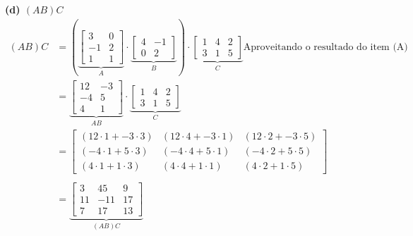 \documentclass[a4paper,12pt]{article}
\begin{document}
\textbf{(d) $(AB)C$}
\begin{align*}
    (AB)C &=( 
    \underbrace{
    \begin{bmatrix}
        3 & 0\\
        -1 & 2\\
        1 & 1
    \end{bmatrix}}_{A} 
    \cdot
    \underbrace{
    \begin{bmatrix}
        4 & -1\\
        0 & 2
    \end{bmatrix}}_{B})
    \cdot
    \underbrace{
    \begin{bmatrix}
        1 & 4 & 2\\
        3 & 1 & 5
    \end{bmatrix}}_{C}
    \textrm{Aproveitando o resultado do item (A)} \\
    &=
    \underbrace{
    \begin{bmatrix}
        12 & -3\\
        -4 & 5 \\
        4 & 1
    \end{bmatrix}}_{AB}
    \cdot
    \underbrace{
    \begin{bmatrix}
        1 & 4 & 2\\
        3 & 1 & 5
    \end{bmatrix}}_{C} \\
    &=
    \begin{bmatrix}
        (12 \cdot 1 + -3 \cdot 3) & (12 \cdot 4 + -3 \cdot 1) & (12 \cdot 2 + -3 \cdot 5)\\
        (-4 \cdot 1 + 5 \cdot 3) & (-4 \cdot 4 + 5 \cdot 1) & (-4 \cdot 2 + 5 \cdot 5)\\
        (4 \cdot 1 + 1 \cdot 3) & (4 \cdot 4 + 1 \cdot 1) & (4 \cdot 2 + 1 \cdot 5)
    \end{bmatrix} \\ \\
    &=
    \underbrace{
    \begin{bmatrix}
        3 & 45 & 9 \\
        11 & -11 & 17 \\
        7 & 17 & 13
    \end{bmatrix}}_{(AB)C}
\end{align*}
\end{document}

